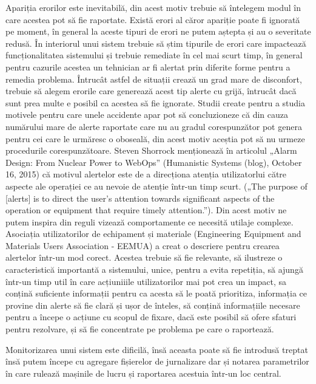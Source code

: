 Apariția erorilor este inevitabilă, din acest motiv trebuie să întelegem modul în care
acestea pot să fie raportate. Există erori al căror apariție poate fi ignorată pe moment, în 
general la aceste tipuri de erori ne putem aștepta și au o severitate redusă. În interiorul unui sistem
trebuie să știm tipurile de erori care impactează funcționalitatea sistemului și trebuie remediate
în cel mai scurt timp, în general pentru cazurile acestea un tehnician ar fi alertat 
prin diferite forme pentru a remedia problema. Întrucât astfel de situații crează un grad 
mare de disconfort, trebuie să alegem erorile care generează acest tip alerte cu grijă,
întrucât dacă sunt prea multe e posibil ca acestea să fie ignorate. Studii create
pentru a studia motivele pentru care unele accidente apar pot să concluzioneze
că din cauza numărului mare de alerte raportate care nu au gradul corespunzător pot genera
pentru cei care le urmăresc o oboseală, din acest motiv aceștia pot să nu urmeze procedurile
corespunzătoare. Steven Shorrock menționează în articolul „Alarm Design: From Nuclear
Power to WebOps” (Humanistic Systems (blog), October 16, 2015) că motivul alertelor
este de a direcționa atenția utilizatorlui către aspecte ale operației ce au nevoie
de atenție într-un timp scurt. („The purpose of [alerts] is to direct the user's attention towards 
significant aspects of the operation or equipment that require timely attention.”). Din acest motiv
ne putem inspira din reguli vizează comportamente ce necesită utilaje complexe.
Asociația utilizatorilor de echipament și materiale (Engineering Equipment and Materials Users Association - EEMUA)
a creat o descriere pentru crearea alertelor într-un mod corect. Acestea trebuie să fie relevante,
să ilustreze o caracteristică importantă a sistemului, unice, pentru a evita repetiția, să ajungă 
într-un timp util în care acțiuniiile utilizatorilor mai pot crea un impact, sa conțină
suficiente informații pentru ca acesta să le poată prioritiza, informația ce provine din alerte
să fie clară și ușor de înteles, să conțină informațiile necesare pentru a începe o acțiune cu scopul
de fixare, dacă este posibil să ofere sfaturi pentru rezolvare, și să fie concentrate pe 
problema pe care o raportează.

Monitorizarea unui sistem este dificilă, însă aceasta poate să fie introdusă treptat însă 
putem începe cu agregare fișierelor de jurnalizare dar și notarea parametrilor în care rulează
mașinile de lucru și raportarea acestuia într-un loc central.
